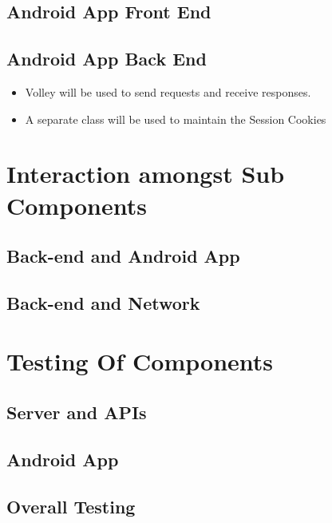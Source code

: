 \documentclass{article}
\begin{document}
\begin{enumerate}
					\end{enumerate}
			\subsection{Android App Front End}
			\subsection{Android App Back End}
			\begin{itemize}
			\item Volley will be used to send requests and receive responses.
			\item A separate class will be used to maintain the Session Cookies
			\end{itemize}
	\section{Interaction amongst Sub Components}
			\subsection{Back-end and Android App}
			\subsection{Back-end and Network}
	
	\section{Testing Of Components}
			\subsection{Server and APIs}
			\subsection{Android App}
			\subsection{Overall Testing}
	
\end{document}
